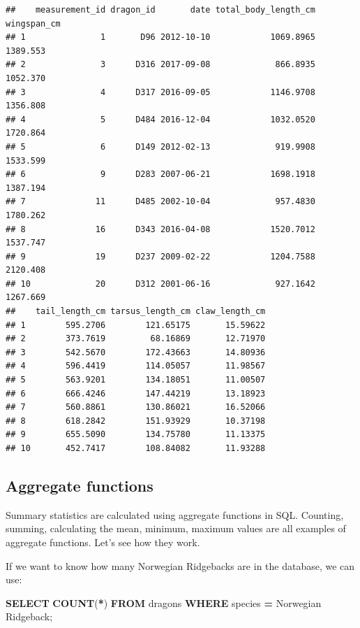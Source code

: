 \documentclass[
]{book}
\newenvironment{Shaded}{\begin{snugshade}}{\end{snugshade}}
\newcommand{\FunctionTok}[1]{\textcolor[rgb]{0.13,0.29,0.53}{\textbf{#1}}}
\newcommand{\KeywordTok}[1]{\textcolor[rgb]{0.13,0.29,0.53}{\textbf{#1}}}
\newcommand{\NormalTok}[1]{#1}
\newcommand{\OperatorTok}[1]{\textcolor[rgb]{0.81,0.36,0.00}{\textbf{#1}}}
\newcommand{\StringTok}[1]{\textcolor[rgb]{0.31,0.60,0.02}{#1}}
\begin{document}
\begin{verbatim}
##    measurement_id dragon_id       date total_body_length_cm wingspan_cm
## 1               1       D96 2012-10-10            1069.8965    1389.553
## 2               3      D316 2017-09-08             866.8935    1052.370
## 3               4      D317 2016-09-05            1146.9708    1356.808
## 4               5      D484 2016-12-04            1032.0520    1720.864
## 5               6      D149 2012-02-13             919.9908    1533.599
## 6               9      D283 2007-06-21            1698.1918    1387.194
## 7              11      D485 2002-10-04             957.4830    1780.262
## 8              16      D343 2016-04-08            1520.7012    1537.747
## 9              19      D237 2009-02-22            1204.7588    2120.408
## 10             20      D312 2001-06-16             927.1642    1267.669
##    tail_length_cm tarsus_length_cm claw_length_cm
## 1        595.2706        121.65175       15.59622
## 2        373.7619         68.16869       12.71970
## 3        542.5670        172.43663       14.80936
## 4        596.4419        114.05057       11.98567
## 5        563.9201        134.18051       11.00507
## 6        666.4246        147.44219       13.18923
## 7        560.8861        130.86021       16.52066
## 8        618.2842        151.93929       10.37198
## 9        655.5090        134.75780       11.13375
## 10       452.7417        108.84082       11.93288
\end{verbatim}

\hypertarget{aggregate-functions}{%
\subsection{Aggregate functions}\label{aggregate-functions}}

Summary statistics are calculated using aggregate functions in SQL. Counting,
summing, calculating the mean, minimum, maximum values are all examples of
aggregate functions. Let's see how they work.

If we want to know how many Norwegian Ridgebacks are in the database, we can
use:

\begin{Shaded}
\begin{Highlighting}[]
\KeywordTok{SELECT} \FunctionTok{COUNT}\NormalTok{(}\OperatorTok{*}\NormalTok{) }
\KeywordTok{FROM}\NormalTok{ dragons}
\KeywordTok{WHERE}\NormalTok{ species }\OperatorTok{=} \StringTok{\textquotesingle{}Norwegian Ridgeback\textquotesingle{}}\NormalTok{;}
\end{Highlighting}
\end{Shaded}
\end{document}
